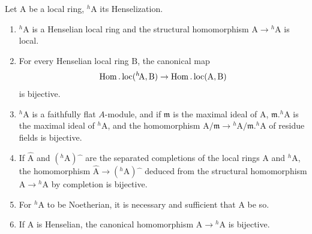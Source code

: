 \begin{theorem}[18.6.6]
\label{IV.18.6.6}
Let $\mathrm{A}$ be a local ring, ${}^h\!\mathrm{A}$ its Henselization.
\begin{enumerate}[label=\emph{\roman*)}]
  \item ${}^h\!\mathrm{A}$ is a Henselian local ring and the structural homomorphism $\mathrm{A}\to{}^h\!\mathrm{A}$ is local.
  \item For every Henselian local ring $\mathrm{B}$, the canonical map
  \[
    \operatorname{Hom}.\operatorname{loc}({}^h\!\mathrm{A},\mathrm{B})\to\operatorname{Hom}.\operatorname{loc}(\mathrm{A},\mathrm{B})
  \]
  is bijective.
  \item ${}^h\!\mathrm{A}$ is a faithfully flat $A$-module, and if $\mathfrak{m}$ is the maximal ideal of $\mathrm{A}$, $\mathfrak{m}.{}^h\!\mathrm{A}$ is the maximal ideal of ${}^h\!\mathrm{A}$, and the homomorphism $\mathrm{A}/\mathfrak{m}\to{}^h\!\mathrm{A}/\mathfrak{m}.{}^h\!\mathrm{A}$ of residue fields is bijective.
  \item If $\hat{\mathrm{A}}$ and $({}^h\!\mathrm{A})\hat{\phantom{x}}$ are the separated completions of the local rings $\mathrm{A}$ and ${}^h\!\mathrm{A}$, the homomorphism $\hat{\mathrm{A}}\to({}^h\!\mathrm{A})\hat{\phantom{x}}$ deduced from the structural homomorphism $\mathrm{A}\to{}^h\!\mathrm{A}$ by completion is bijective.
  \item For ${}^h\!\mathrm{A}$ to be Noetherian, it is necessary and sufficient that A be so.
  \item If A is Henselian, the canonical homomorphism $\mathrm{A}\to{}^h\!\mathrm{A}$ is bijective.
\end{enumerate}
\end{theorem}

